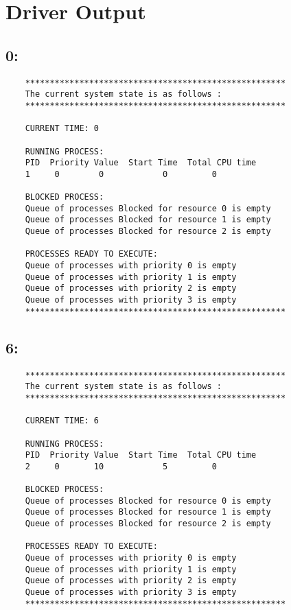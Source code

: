 \documentclass{article}
\begin{document}
\section*{Driver Output}
\subsection*{0:}
\begin{verbatim}
    *****************************************************
    The current system state is as follows : 
    *****************************************************
    
    CURRENT TIME: 0

    RUNNING PROCESS:
    PID  Priority Value  Start Time  Total CPU time
    1     0        0            0         0

    BLOCKED PROCESS:
    Queue of processes Blocked for resource 0 is empty
    Queue of processes Blocked for resource 1 is empty
    Queue of processes Blocked for resource 2 is empty

    PROCESSES READY TO EXECUTE:
    Queue of processes with priority 0 is empty
    Queue of processes with priority 1 is empty
    Queue of processes with priority 2 is empty
    Queue of processes with priority 3 is empty
    *****************************************************
\end{verbatim}

\subsection*{6:}
\begin{verbatim}
    *****************************************************
    The current system state is as follows : 
    *****************************************************
    
    CURRENT TIME: 6

    RUNNING PROCESS:
    PID  Priority Value  Start Time  Total CPU time
    2     0       10            5         0

    BLOCKED PROCESS:
    Queue of processes Blocked for resource 0 is empty
    Queue of processes Blocked for resource 1 is empty
    Queue of processes Blocked for resource 2 is empty

    PROCESSES READY TO EXECUTE:
    Queue of processes with priority 0 is empty
    Queue of processes with priority 1 is empty
    Queue of processes with priority 2 is empty
    Queue of processes with priority 3 is empty
    *****************************************************
\end{verbatim}
\end{document}
